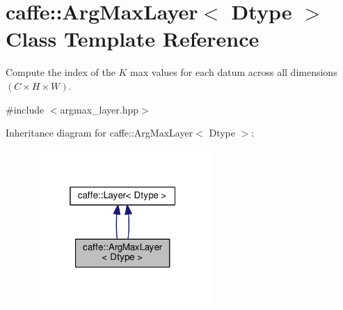 \hypertarget{classcaffe_1_1_arg_max_layer}{}\section{caffe\+:\+:Arg\+Max\+Layer$<$ Dtype $>$ Class Template Reference}
\label{classcaffe_1_1_arg_max_layer}


Compute the index of the $ K $ max values for each datum across all dimensions $ (C \times H \times W) $.  




{\ttfamily \#include $<$argmax\+\_\+layer.\+hpp$>$}



Inheritance diagram for caffe\+:\+:Arg\+Max\+Layer$<$ Dtype $>$\+:
\nopagebreak
\begin{figure}[H]
\begin{center}
\leavevmode
\includegraphics[width=193pt]{classcaffe_1_1_arg_max_layer__inherit__graph}
\end{center}
\end{figure}
